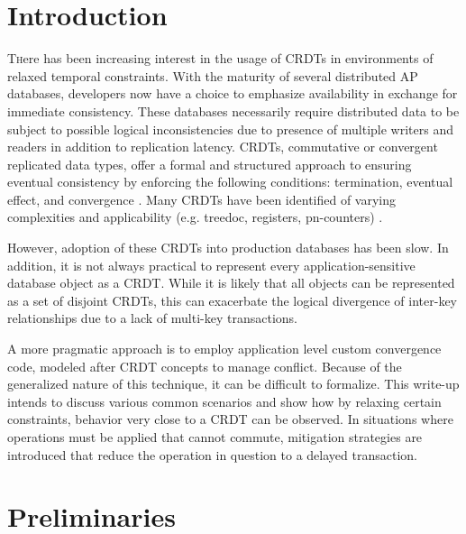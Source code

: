 \documentclass[twoside]{article}
\begin{document}
\begin{multicols}{2} %

\section{Introduction}

\lettrine[nindent=0em,lines=3]{T} here has been increasing interest in
the usage of CRDTs in environments of relaxed temporal
constraints. With the maturity of several distributed AP databases,
developers now have a choice to emphasize availability in exchange for
immediate consistency. These databases necessarily require distributed
data to be subject to possible logical inconsistencies due to presence
of multiple writers and readers in addition to replication
latency. CRDTs, commutative or convergent replicated data types, offer
a formal and structured approach to ensuring eventual consistency by
enforcing the following conditions: termination, eventual effect, and
convergence \cite{shapiro2011convergent}. Many CRDTs have been
identified of varying complexities and applicability (e.g. treedoc,
registers, pn-counters) \cite{letia2009crdts, shapiro2011convergent}.

However, adoption of these CRDTs into production databases has been
slow. In addition, it is not always practical to represent every
application-sensitive database object as a CRDT. While it is likely
that all objects can be represented as a set of disjoint CRDTs, this
can exacerbate the logical divergence of inter-key relationships due
to a lack of multi-key transactions.

A more pragmatic approach is to employ application level custom
convergence code, modeled after CRDT concepts to manage
conflict. Because of the generalized nature of this technique, it can
be difficult to formalize. This write-up intends to discuss various
common scenarios and show how by relaxing certain constraints,
behavior very close to a CRDT can be observed. In situations where
operations must be applied that cannot commute, mitigation strategies
are introduced that reduce the operation in question to a delayed
transaction.


\section{Preliminaries}


\end{multicols}
\end{document}
